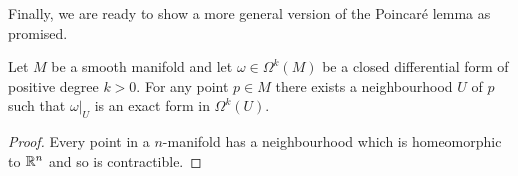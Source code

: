 Finally, we are ready to show a more general version of the Poincar\'e lemma as promised.

\begin{corollary}\label{cor:plemma}
  Let $M$ be a smooth manifold and let $\omega\in\Omega^k(M)$ be a closed differential form of positive degree $k>0$.
  For any point $p\in M$ there exists a neighbourhood $U$ of $p$ such that $\omega|_U$ is an exact form in $\Omega^k(U)$.
\end{corollary}
\begin{proof}
  Every point in a $n$-manifold has a neighbourhood which is homeomorphic to $\mathbb{R}^n$ and so is contractible.
\end{proof}
